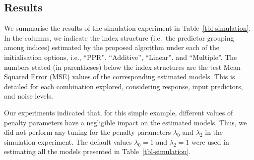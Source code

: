 \documentclass[
  11pt,
  a4paper,
]{report}
\begin{document}
\subsection{Results}\label{sec-sim-results}

We summarise the results of the simulation experiment in
Table~\ref{tbl-simulation}. In the columns, we indicate the index
structure (i.e.~the predictor grouping among indices) estimated by the
proposed algorithm under each of the initialisation options, i.e.,
``PPR'', ``Additive'', ``Linear'', and ``Multiple''. The numbers stated
(in parentheses) below the index structures are the test Mean Squared
Error (MSE) values of the corresponding estimated models. This is
detailed for each combination explored, considering response, input
predictors, and noise levels.

Our experiments indicated that, for this simple example, different
values of penalty parameters have a negligible impact on the estimated
models. Thus, we did not perform any tuning for the penalty parameters
\(\lambda_{0}\) and \(\lambda_{2}\) in the simulation experiment. The
default values \(\lambda_{0} = 1\) and \(\lambda_{2} = 1\) were used in
estimating all the models presented in Table~\ref{tbl-simulation}.
\end{document}
